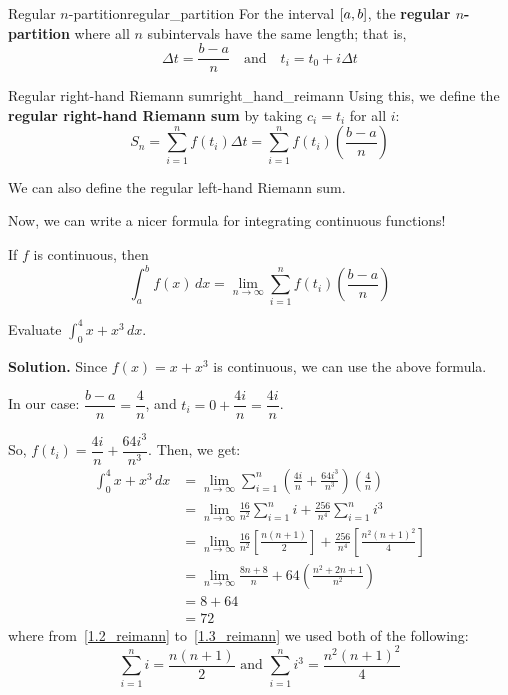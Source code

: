 \begin{Definition}{Regular $n$-partition}{regular_partition}
    For the interval $ \interval{a}{b} $, the \textbf{regular $ n $-partition}
    where all $ n $ subintervals
    have the same length; that is,
    \[ \Delta t=\frac{b-a}{n} \quad\text{and}\quad  t_i=t_0+i\Delta t \]
\end{Definition}

\begin{Definition}{Regular right-hand Riemann sum}{right_hand_reimann}
    Using this, we define the \textbf{regular right-hand Riemann sum} by taking $ c_i=t_i $ for
    all $ i $:
    \[ S_n=\sum\limits_{i=1}^{n} f(t_i)\Delta t=\sum\limits_{i=1}^{n} f(t_i)\left(\frac{b-a}{n}\right) \]
\end{Definition}

\begin{Remark}{}{}
    We can also define the regular left-hand Riemann sum.
\end{Remark}

Now, we can write a nicer formula for integrating continuous functions!

If $ f $ is continuous, then
\[ \boxed{\int_{a}^{b} f(x)\, d{x} =
        \lim\limits_{{n} \to {\infty}} \sum\limits_{i=1}^{n} f(t_i)\left(\frac{b-a}{n}\right)} \]

\begin{Example}{}{}
    Evaluate
    $ \displaystyle\int_{0}^{4} x+x^3\, d{x} $.

    \textbf{Solution.}
    Since $ f(x)=x+x^3 $ is continuous, we can use the above formula.

    In our case: $ \dfrac{b-a}{n} = \dfrac{4}{n} $, and $ t_i = 0+\dfrac{4i}{n} = \dfrac{4i}{n} $.

    So, $ f(t_i) = \dfrac{4i}{n} + \dfrac{64i^3}{n^3} $.
    Then, we get:
    \begin{align}
        \int_{0}^{4} x+x^3\, d{x}
         & = \lim\limits_{{n} \to {\infty}} \sum\limits_{i=1}^{n}
        \left( \frac{4i}{n} +\frac{64i^3}{n^3} \right)\left( \frac{4}{n} \right)                  \\
         & = \lim\limits_{{n} \to {\infty}} \frac{16}{n^2} \sum\limits_{i=1}^{n} i +
        \frac{256}{n^4} \sum\limits_{i=1}^{n} i^3 \label{1.2_reimann}                             \\
         & = \lim\limits_{{n} \to {\infty}} \frac{16}{n^2} \left[ \frac{n(n+1)}{2} \right] +
        \frac{256}{n^4} \left[ \frac{n^2(n+1)^2}{4} \right] \label{1.3_reimann}                   \\
         & = \lim\limits_{{n} \to {\infty}} \frac{8n+8}{n} +64 \left(\frac{n^2+2n+1}{n^2} \right) \\
         & = 8+64                                                                                 \\
         & =72
    \end{align}
    where from~\ref{1.2_reimann} to~\ref{1.3_reimann} we used both of the following:
    \[ \sum\limits_{i=1}^{n} i=\frac{n(n+1)}{2} \text{ and }
        \sum\limits_{i=1}^{n} i^3=\frac{n^2(n+1)^2}{4} \]
\end{Example}

